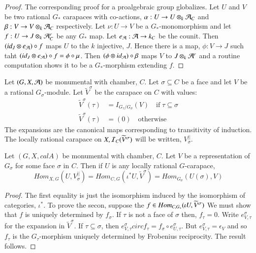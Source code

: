 \begin{proof}
The corresponding proof for a proalgebraic group globalizes. Let $U$ and $V$ be two rational $G_{*}$ carapaces with co-actions, $\alpha : U \rightarrow U \otimes_{k}\mathcal{A}_{C}$ and $\beta : V\rightarrow V  \otimes_{k} \mathcal{A}_{C}$ respectively. Let $\nu:U \rightarrow V$ be a $G_{*}$-monomorphism and let $f : U \rightarrow J \otimes_{k} \mathcal{A}_{C}^{r}$ be any $G_{*}$ map. Let $e_{\mathcal{A}} : \mathcal{A} \rightarrow k_{C}$ be the counit. Then $(id_{J} \otimes e_{\mathcal{A}}) \circ f$ maps $U$ to the $k$ injective, $J$. Hence there is a map, $\phi : V \rightarrow J$ such taht $(id_{J} \otimes e_{\mathcal{A}}) \circ f = \phi  \circ \mu$. Then $(\phi \otimes id_{\mathcal{A}}) \circ \beta$ maps $V$ to $J \otimes_{k}\mathcal{A}^{r}$ and  a routine computation shows it to be a $G_{*}$-morphism extending $f$. 
\end{proof}

\begin{definition}\label{chap6-definition-14.4}
Let $(G, X, \mathcal{A})$ be monumental with chamber, $C$. Let $\sigma \subseteq C $ be a face and let $V$ be a rational $G_{\sigma}$-module. Let $\widetilde{V}^{\sigma}$ be the carapace on $C$ with values:
\begin{equation*}
\begin{aligned}\label{chap6-eq-14.5}
\widetilde{V}^{\sigma}(\tau) &= I_{G_{\tau}/G_{\sigma}}(V) \quad \text{if}\; \tau \subseteq \sigma\\
\widetilde{V}^{\sigma}(\tau) &= (0) \quad \text{otherwise}
\end{aligned}\tag{14.5}
\end{equation*}
The expansions are the canonical maps corresponding to transitivity of induction. The locally rational carapace on $X, \mathcal{I}_{C}(\widetilde{V}^{\sigma})$ will be written, $V_{\sigma}^{||}$.
\end{definition}

\setcounter{definition}{5}
\begin{seclem}\label{chap6-lemma-14.6}
Let $(G, X, calA)$ be monumental with chamber, $C$. Let $V$ be a representation of $G_{\sigma}$ for some face $\sigma$ in $C$. Then if $U$ is any locally rational $G$-carapace,
$$
Hom_{X, G}(U,V_{\sigma}^{||})=Hom_{C, G}(\iota^{*} U, \widetilde{V}^{\sigma}) = Hom_{G_{\sigma}}(U(\sigma), V)
$$
\end{seclem}

\begin{proof}
The first equality is just the isomorphism induced by the isomorphism of categories, $\iota^{*}$. To prove the secon, suppose the $f \in Hom_{C, G_{*}}\break (\iota U, \widetilde{V}^{\sigma})$ We must show that $f$ is uniquely determined by $f_{\sigma}$. If $\tau$ is not a face of $\sigma$ then, $f_{\tau} = 0$. Write $e_{V, \tau}^{\sigma}$ for the expansion in $\widetilde{V}^{\sigma}$. If $\tau \subseteq \sigma$, then $e_{V, \tau}^{\sigma} circ f_{\tau} = f_{\sigma} \circ e_{U, \tau}^{\sigma}$. But $e_{V, \tau}^{\sigma} = \epsilon_{V}$ and so $f_{\tau}$ is the $G_{\tau}$-morphism uniquely determined by Frobenius reciprocity. The result follows.
\end{proof}

